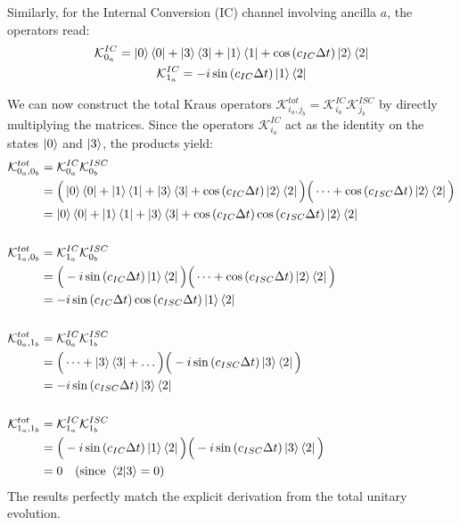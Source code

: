 \documentclass[a4paper,12pt]{article}
\begin{document}
Similarly, for the Internal Conversion (IC) channel involving ancilla $ a $, the operators read:
\begin{gather}
	\mathcal{K}_{0_a}^{IC} = \ket{0}\bra{0} + \ket{3}\bra{3} + \ket{1}\bra{1} + \cos \left( c_{IC} \Delta t \right) \ket{2}\bra{2} \\
	\mathcal{K}_{1_a}^{IC} = -i \sin \left( c_{IC} \Delta t \right) \ket{1}\bra{2}
\end{gather}

We can now construct the total Kraus operators $ \mathcal{K}_{i_a, j_b}^{tot} = \mathcal{K}_{i_a}^{IC} \mathcal{K}_{j_b}^{ISC} $ by directly multiplying the matrices. 
Since the operators $ \mathcal{K}_{i_a}^{IC} $ act as the identity on the states $ \ket{0} $ and $ \ket{3} $, the products yield:
\begin{align}
	\mathcal{K}_{0_a, 0_b}^{tot} &= \mathcal{K}_{0_a}^{IC} \mathcal{K}_{0_b}^{ISC} \notag \\
	&= \Big( \ket{0}\bra{0} + \ket{1}\bra{1} + \ket{3}\bra{3} + \cos \left( c_{IC} \Delta t \right) \ket{2}\bra{2} \Big) \Big( \dots + \cos \left( c_{ISC} \Delta t \right) \ket{2}\bra{2} \Big) \notag \\
	&= \ket{0}\bra{0} + \ket{1}\bra{1} + \ket{3}\bra{3} + \cos \left( c_{IC} \Delta t \right) \cos \left( c_{ISC} \Delta t \right) \ket{2}\bra{2} \\
	\notag \\
	\mathcal{K}_{1_a, 0_b}^{tot} &= \mathcal{K}_{1_a}^{IC} \mathcal{K}_{0_b}^{ISC} \notag \\
	&= \Big( -i \sin \left( c_{IC} \Delta t \right) \ket{1}\bra{2} \Big) \Big( \dots + \cos \left( c_{ISC} \Delta t \right) \ket{2}\bra{2} \Big) \notag \\
	&= -i \sin \left( c_{IC} \Delta t \right) \cos \left( c_{ISC} \Delta t \right) \ket{1}\bra{2} \\
	\notag \\
	\mathcal{K}_{0_a, 1_b}^{tot} &= \mathcal{K}_{0_a}^{IC} \mathcal{K}_{1_b}^{ISC} \notag \\
	&= \Big( \dots + \ket{3}\bra{3} + \dots \Big) \Big( -i \sin \left( c_{ISC} \Delta t \right) \ket{3}\bra{2} \Big) \notag \\
	&= -i \sin \left( c_{ISC} \Delta t \right) \ket{3}\bra{2} \\
	\notag \\
	\mathcal{K}_{1_a, 1_b}^{tot} &= \mathcal{K}_{1_a}^{IC} \mathcal{K}_{1_b}^{ISC} \notag \\
	&= \Big( -i \sin \left( c_{IC} \Delta t \right) \ket{1}\bra{2} \Big) \Big( -i \sin \left( c_{ISC} \Delta t \right) \ket{3}\bra{2} \Big) \notag \\
	&= 0 \quad (\text{since } \braket{2|3} = 0)
\end{align}
The results perfectly match the explicit derivation from the total unitary evolution.
\end{document}
